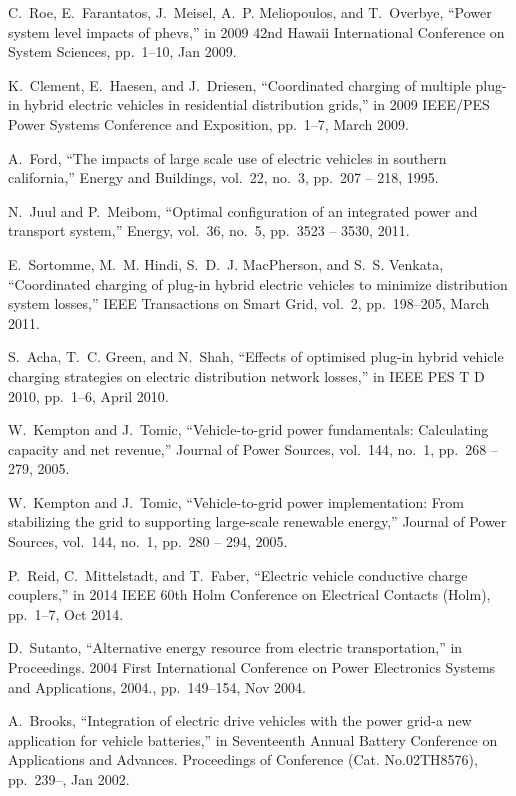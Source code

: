 C.~Roe, E.~Farantatos, J.~Meisel, A.~P. Meliopoulos, and T.~Overbye, ``Power
  system level impacts of phevs,'' in 2009 42nd Hawaii International
  Conference on System Sciences, pp.~1--10, Jan 2009.

K.~Clement, E.~Haesen, and J.~Driesen, ``Coordinated charging of multiple
  plug-in hybrid electric vehicles in residential distribution grids,'' in
  2009 IEEE/PES Power Systems Conference and Exposition, pp.~1--7, March 2009.

A.~Ford, ``The impacts of large scale use of electric vehicles in southern
  california,'' Energy and Buildings, vol.~22, no.~3, pp.~207 -- 218,
  1995.

N.~Juul and P.~Meibom, ``Optimal configuration of an integrated power and
  transport system,'' Energy, vol.~36, no.~5, pp.~3523 -- 3530, 2011.

E.~Sortomme, M.~M. Hindi, S.~D.~J. MacPherson, and S.~S. Venkata, ``Coordinated
  charging of plug-in hybrid electric vehicles to minimize distribution system
  losses,'' IEEE Transactions on Smart Grid, vol.~2, pp.~198--205, March
  2011.

S.~Acha, T.~C. Green, and N.~Shah, ``Effects of optimised plug-in hybrid
  vehicle charging strategies on electric distribution network losses,'' in
  IEEE PES T D 2010, pp.~1--6, April 2010.

W.~Kempton and J.~Tomic, ``Vehicle-to-grid power fundamentals: Calculating
  capacity and net revenue,'' Journal of Power Sources, vol.~144, no.~1,
  pp.~268 -- 279, 2005.

W.~Kempton and J.~Tomic, ``Vehicle-to-grid power implementation: From
  stabilizing the grid to supporting large-scale renewable energy,'' 
  Journal of Power Sources, vol.~144, no.~1, pp.~280 -- 294, 2005.

P.~Reid, C.~Mittelstadt, and T.~Faber, ``Electric vehicle conductive charge
  couplers,'' in 2014 IEEE 60th Holm Conference on Electrical Contacts
  (Holm), pp.~1--7, Oct 2014.

D.~Sutanto, ``Alternative energy resource from electric transportation,'' in
  Proceedings. 2004 First International Conference on Power Electronics
  Systems and Applications, 2004., pp.~149--154, Nov 2004.

A.~Brooks, ``Integration of electric drive vehicles with the power grid-a new
  application for vehicle batteries,'' in Seventeenth Annual Battery
  Conference on Applications and Advances. Proceedings of Conference (Cat.
  No.02TH8576), pp.~239--, Jan 2002.

